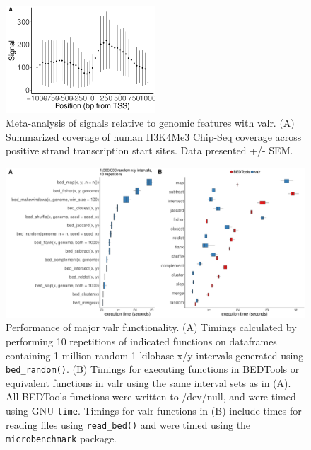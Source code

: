 \documentclass[9pt,a4paper]{extarticle}
\begin{document}

\begin{figure}[!htb]
\centering
\includegraphics[width=0.5\textwidth]{figure2.pdf}
\caption{\label{fig:Figure 2}Meta-analysis of signals relative to genomic features with valr. \textnormal{(A) Summarized coverage of human H3K4Me3 Chip-Seq coverage across positive strand transcription start sites. Data presented +/- SEM.}}
\end{figure}

\begin{figure}[!htb]
\centering
\includegraphics[width=1\textwidth]{figure3.pdf}
\caption{\label{fig:Figure 3} Performance of major valr functionality. \textnormal{(A)  Timings calculated by performing 10 repetitions of indicated functions on dataframes containing 1 million random 1 kilobase x/y intervals generated using \texttt{bed\_random()}. (B) Timings for executing functions in BEDTools or equivalent functions in valr using the same interval sets as in (A). All BEDTools functions were written to /dev/null, and were timed using GNU \texttt{time}. Timings for valr functions in (B) include times for reading files using \texttt{read\_bed()} and were timed using the \texttt{microbenchmark} package.}}
%
%
\end{figure}
\end{document}
